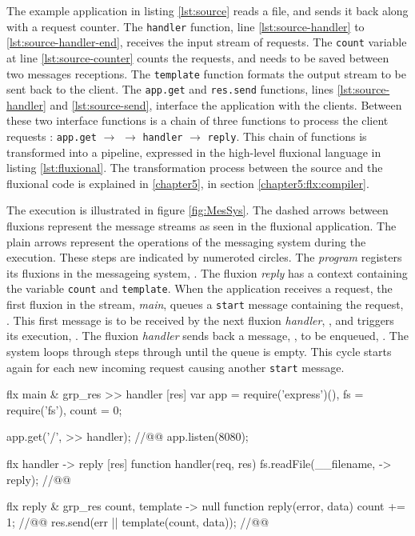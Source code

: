 The example application in listing \ref{lst:source} reads a file, and sends it back along with a request counter.
The \texttt{handler} function, line \ref{lst:source-handler} to \ref{lst:source-handler-end}, receives the input stream of requests.
The \texttt{count} variable at line \ref{lst:source-counter} counts the requests, and needs to be saved between two messages receptions.
The \texttt{template} function formats the output stream to be sent back to the client.
The \texttt{app.get} and \texttt{res.send} functions, lines \ref{lst:source-handler} and \ref{lst:source-send}, interface the application with the clients.
Between these two interface functions is a chain of three functions to process the client requests : \texttt{app.get} $\to$ \hspace{-1.4em} $\to$ \texttt{handler} $\to$ \texttt{reply}.
This chain of functions is transformed into a pipeline, expressed in the high-level fluxional language in listing \ref{lst:fluxional}.
The transformation process between the source and the fluxional code is explained in \ref{chapter5}, in section \ref{chapter5:flx:compiler}.

The execution is illustrated in figure \ref{fig:MesSys}.
The dashed arrows between fluxions represent the message streams as seen in the fluxional application.
The plain arrows represent the operations of the messaging system during the execution.
These steps are indicated by numeroted circles.
The \textit{program} registers its fluxions in the messageing system, .
The fluxion \textit{reply} has a context containing the variable \texttt{count} and \texttt{tem\-plate}.
When the application receives a request, the first fluxion in the stream, \textit{main}, queues a \texttt{start} message containing the request, .
This first message is to be received by the next fluxion \textit{handler}, , and triggers its execution, .
The fluxion \textit{handler} sends back a message, , to be enqueued, .
The system loops through steps  through  until the queue is empty.
This cycle starts again for each new incoming request causing another \texttt{start} message.

\begin{code}[flx, caption={Example application expressed in the high-level fluxional language}, label={lst:fluxional}]
flx main & grp_res
>> handler [res]
  var app = require('express')(),
      fs = require('fs'),
      count = 0;

  app.get('/', >> handler); //@\label{lst:fluxional-streamtohandler}@
  app.listen(8080);

flx handler
-> reply [res]
  function handler(req, res) {
    fs.readFile(__filename, -> reply); //@\label{lst:fluxional-readfile}@
  }

flx reply & grp_res {count, template}
-> null
  function reply(error, data) {
    count += 1; //@\label{lst:fluxional-counter}@
    res.send(err || template(count, data)); //@\label{lst:fluxional-ressend}@
  }
\end{code}

